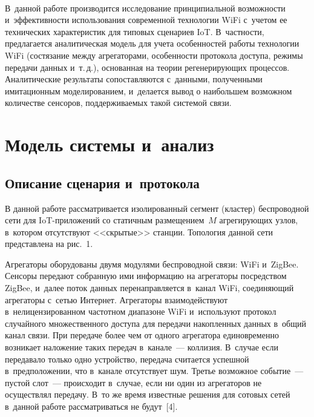 \begin{multicols}{2}
\begin{figure*}[b] %
\vspace*{1pt}
 \begin{center}  
\mbox{%
 \epsfxsize=114.889mm
 }
\end{center} 
\vspace*{-9pt}
     \end{figure*}

В~данной работе производится исследование 
принципиальной возможности и~эффективности использования 
современной технологии WiFi с~учетом ее технических характеристик 
для типовых сценариев IoT. В~частности, предлагается аналитическая 
модель для учета особенностей работы технологии WiFi (состязание 
между агрегаторами, особенности протокола доступа, режимы передачи 
данных и~т.\,д.), основанная на теории регенерирующих процессов. 
Аналитические результаты сопоставляются с~данными, полученными 
имитационным моделированием, и~делается вывод о наибольшем 
возможном количестве сенсоров, поддерживаемых такой системой связи.

\vspace*{-6pt}
   
   \section{Модель системы и~анализ}
   
   \vspace*{-6pt}
   
\subsection{Описание сценария и~протокола}

\vspace*{-1pt}
    
    В данной работе рассматривается изолированный сегмент (кластер) 
беспроводной сети для IoT-при\-ло\-же\-ний со статичным размещением~$M$ 
агрегирующих узлов, в~котором отсутствуют <<скрытые>> станции. 
Топология данной сети представлена на рис.~1. 

Агрегаторы оборудованы 
двумя модулями беспроводной связи: WiFi и~ZigBee. Сенсоры передают 
собранную ими информацию на агрегаторы посредством ZigBee, и~далее 
поток данных перенаправляется в~канал WiFi, соединяющий агрегаторы 
с~сетью Интернет. Агрегаторы взаимодействуют в~нелицензированном 
частотном диапазоне WiFi и~используют протокол случайного 
множественного доступа для передачи накопленных данных в~общий 
канал связи. При передаче более чем от одного агрегатора единовременно 
возникает наложение таких передач в~канале~--- коллизия. В~случае если 
передавало только одно устройство, передача считается успешной 
в~предположении, что в~канале отсутствует шум. Третье возможное 
событие~--- пус\-той слот~--- происходит в~случае, если ни один из 
агрегаторов не осуществлял передачу. В~то же время известные решения 
для сотовых сетей в~данной работе рассматриваться не будут~[4].
    


\end{multicols}
